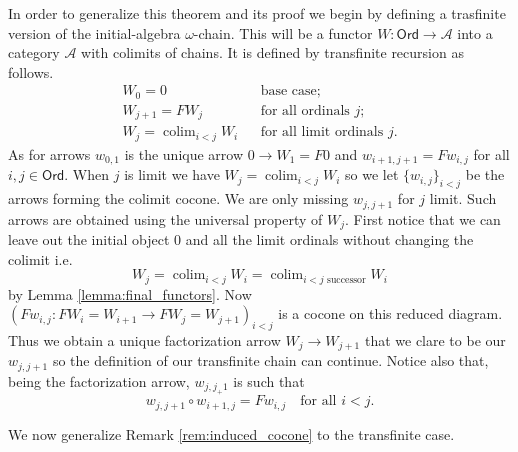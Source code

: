 \documentclass[letterpaper, 11pt, oneside]{memoir}
\theoremstyle{myteo}
\numberwithin{equation}{section}
\DeclareMathOperator*\colim{colim}
\newcommand{\Ord}{\textsf{Ord}}
\newcommand{\A}{\mathscr{A}}
\begin{document}
In order to generalize this theorem and its proof we begin by defining a trasfinite version of the initial-algebra \(\omega\)-chain.
This will be a functor \(W : \Ord \to \A\) into a category \(\A\) with colimits of chains.
It is defined by transfinite recursion as follows.
\begin{align*}
  W_0 = 0 && \text{base case};\\
  W_{j+1} = FW_j && \text{for all ordinals \(j\)};\\
  W_j = \colim_{i < j}W_i && \text{for all limit ordinals \(j\)}.
\end{align*}
As for arrows \(w_{0,1}\) is the unique arrow \(0 \to W_1 = F0\) and \(w_{i + 1, j+1} = Fw_{i,j}\) for all \(i, j \in \Ord\).
When \(j\) is limit we have \(W_j = \colim_{i < j}W_i\) so we let \(\{w_{i,j}\}_{i < j}\) be the arrows forming the colimit cocone.
We are only missing \(w_{j, j+1}\) for \(j\) limit.
Such arrows are obtained using the universal property of \(W_j\).
First notice that we can leave out the initial object \(0\) and all the limit ordinals without changing the colimit i.e.
\begin{equation*}
  W_j = \colim_{i < j}W_i = \colim_{\text{\(i < j\) successor}}W_i
\end{equation*}
by Lemma \ref{lemma:final_functors}.
Now \((Fw_{i,j} : FW_i = W_{i+1} \to FW_{j} = W_{j+1})_{i < j}\) is a cocone on this reduced diagram.
Thus we obtain a unique factorization arrow \(W_j \to W_{j+1}\) that we clare to be our \(w_{j, j+1}\) so the definition of our transfinite chain can continue.
Notice also that, being the factorization arrow, \(w_{j, j_+1}\) is such that
\begin{equation}
  \label{eq:omega-to-omega-plus-one}
  w_{j, j+1} \circ w_{i+1, j} = Fw_{i, j} \quad \text{for all \(i < j\)}.
\end{equation}

We now generalize Remark \ref{rem:induced_cocone} to the transfinite case.
\end{document}
